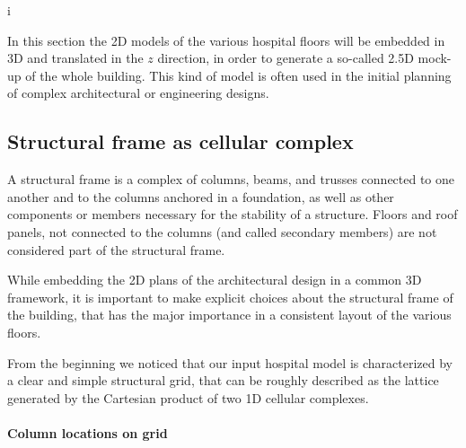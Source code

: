 i\documentclass[11pt,oneside]{article}    %
\begin{document}
In this section the 2D models of the various hospital floors will be embedded in 3D and translated in the $z$ direction, in order to generate a so-called 2.5D mock-up of the whole building.
This kind of model is often used in the initial planning of complex architectural or engineering designs.

\subsection{Structural frame as cellular complex}

A structural frame is a complex of columns, beams, and trusses connected to one another and to the columns anchored in a foundation, as well as other components or members necessary for the stability of a structure. Floors and roof panels, not connected to the columns (and called secondary members) are not considered part of the structural frame.

While embedding the 2D plans of the architectural design in a common 3D framework, it is important to make explicit choices about the structural frame of the building, that has the major importance in a consistent layout of the various floors. 

From the beginning we noticed that our input hospital model is characterized by a clear and simple structural grid, that can be roughly described as the lattice generated by the Cartesian product of two 1D cellular complexes.


\paragraph{Column locations on grid}
\end{document}
